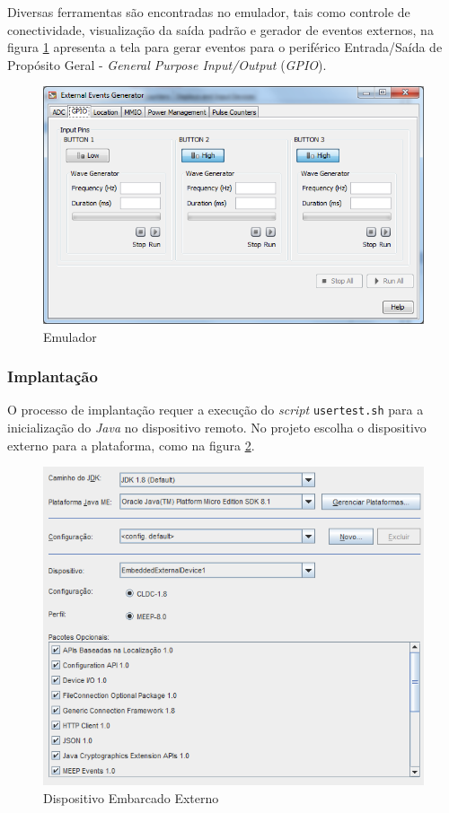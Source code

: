 Diversas ferramentas são encontradas no emulador, tais como controle de 
conectividade, visualização da saída padrão e gerador de eventos externos, na 
figura \ref{fig:java-me/external-events-generator} apresenta a tela para gerar 
eventos para o periférico Entrada/Saída de Propósito Geral - \textit{General 
Purpose Input/Output} (\textit{GPIO}).

\begin{figure}[H]
    \centering
    \includegraphics[width=0.7\linewidth]{figuras/java/java-me-external-events-generator.png}
    \caption{Emulador}
    \label{fig:java-me/external-events-generator}
\end{figure}

\subsubsection{Implantação}

O processo de implantação requer a execução do \textit{script} 
\verb|usertest.sh| para a inicialização do \textit{Java} no dispositivo remoto.
No projeto escolha o dispositivo externo para a plataforma, como na figura 
\ref{fig:java-me/plataform}.

\begin{figure}[H]
    \centering
    \includegraphics[width=0.7\linewidth]{figuras/java/java-me-plataform.png}
    \caption{Dispositivo Embarcado Externo}
    \label{fig:java-me/plataform}
\end{figure}

